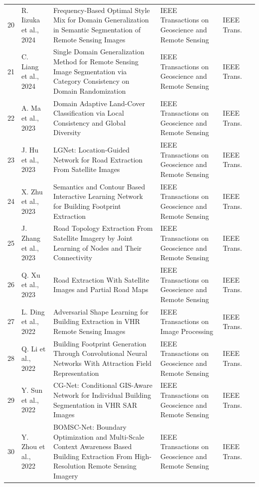 \begin{landscape}
\begin{longtable}{@{}L{0.6cm}L{3.4cm}L{8.2cm}L{5.6cm}L{2.0cm}L{1.2cm}@{}}
20 & R. Iizuka et al., 2024 & Frequency-Based Optimal Style Mix for Domain Generalization in Semantic Segmentation of Remote Sensing Images & IEEE Transactions on Geoscience and Remote Sensing & IEEE Trans. & \cite{L43} \\
21 & C. Liang et al., 2024 & Single Domain Generalization Method for Remote Sensing Image Segmentation via Category Consistency on Domain Randomization & IEEE Transactions on Geoscience and Remote Sensing & IEEE Trans. & \cite{L45} \\
22 & A. Ma et al., 2023 & Domain Adaptive Land-Cover Classification via Local Consistency and Global Diversity & IEEE Transactions on Geoscience and Remote Sensing & IEEE Trans. & \cite{L11} \\
23 & J. Hu et al., 2023 & LGNet: Location-Guided Network for Road Extraction From Satellite Images & IEEE Transactions on Geoscience and Remote Sensing & IEEE Trans. & \cite{L12} \\
24 & X. Zhu et al., 2023 & Semantics and Contour Based Interactive Learning Network for Building Footprint Extraction & IEEE Transactions on Geoscience and Remote Sensing & IEEE Trans. & \cite{L14} \\
25 & J. Zhang et al., 2023 & Road Topology Extraction From Satellite Imagery by Joint Learning of Nodes and Their Connectivity & IEEE Transactions on Geoscience and Remote Sensing & IEEE Trans. & \cite{L37} \\
26 & Q. Xu et al., 2023 & Road Extraction With Satellite Images and Partial Road Maps & IEEE Transactions on Geoscience and Remote Sensing & IEEE Trans. & \cite{L39} \\
27 & L. Ding et al., 2022 & Adversarial Shape Learning for Building Extraction in VHR Remote Sensing Images & IEEE Transactions on Image Processing & IEEE Trans. & \cite{L03} \\
28 & Q. Li et al., 2022 & Building Footprint Generation Through Convolutional Neural Networks With Attraction Field Representation & IEEE Transactions on Geoscience and Remote Sensing & IEEE Trans. & \cite{L04} \\
29 & Y. Sun et al., 2022 & CG-Net: Conditional GIS-Aware Network for Individual Building Segmentation in VHR SAR Images & IEEE Transactions on Geoscience and Remote Sensing & IEEE Trans. & \cite{L05} \\
30 & Y. Zhou et al., 2022 & BOMSC-Net: Boundary Optimization and Multi-Scale Context Awareness Based Building Extraction From High-Resolution Remote Sensing Imagery & IEEE Transactions on Geoscience and Remote Sensing & IEEE Trans. & \cite{L06} \\

\end{longtable}
\end{landscape}
